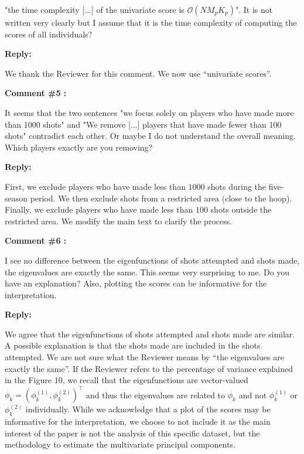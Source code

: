 \documentclass[11pt]{article}
\begin{document}
 "the time complexity [...] of the univariate score is $\mathcal{O}(NM_pK_p)$". It is not written very clearly but I assume that it is the time complexity of computing the scores of all individuals?


\medskip

\normalfont

\textbf{Reply:}

We thank the Reviewer for this comment. We now use ``univariate scores''.

\bigskip

\itshape



\textbf{Comment \#5 :}

It seems that the two sentences "we focus solely on players who have made more than 1000 shots" and "We remove [...] players that have made fewer than 100 shots" contradict each other. Or maybe I do not understand the overall meaning. Which players exactly are you removing?

\medskip

\normalfont

\textbf{Reply:}

First, we exclude players who have made less than $1000$ shots during the five-season period. We then exclude shots from a restricted area (close to the hoop). Finally, we exclude players who have made less than $100$ shots outside the restricted area. We modify the main text to clarify the process.
\bigskip


\itshape

\textbf{Comment \#6 :}

I see no diﬀerence between the eigenfunctions of shots attempted and shots made, the eigenvalues are exactly the same. This seems very surprising to me. Do you have an explanation? Also, plotting the scores can be informative
for the interpretation.


\medskip

\normalfont

\textbf{Reply:}

We agree that the eigenfunctions of shots attempted and shots made are similar. A possible explanation is that the shots made are included in the shots attempted. We are not sure what the Reviewer means by ``the eigenvalues are exactly the same''. If the Reviewer refers to the percentage of variance explained in the Figure 10, we recall that the eigenfunctions are vector-valued $\phi_k = (\phi_k^{(1)}, \phi_k^{(2)})^\top$ and thus the eigenvalues are related to $\phi_k$ and not $\phi_k^{(1)}$ or $\phi_k^{(2)}$ individually. While we acknowledge that a plot of the scores may be informative for the interpretation, we choose to not include it as the main interest of the paper is not the analysis of this specific dataset, but the methodology to estimate the multivariate principal components.
\end{document}
